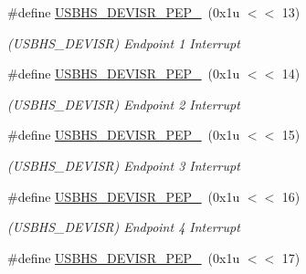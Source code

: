 \begin{DoxyCompactItemize}
\mbox{\label{group__SAME70__USBHS_ga345d60ae5fbb8b49e41a2683d10441bc}} 
\#define \mbox{\hyperlink{group__SAME70__USBHS_ga345d60ae5fbb8b49e41a2683d10441bc}{U\+S\+B\+H\+S\+\_\+\+D\+E\+V\+I\+S\+R\+\_\+\+P\+E\+P\+\_}}~(0x1u $<$$<$ 13)
\begin{DoxyCompactList}\small\item\em (U\+S\+B\+H\+S\+\_\+\+D\+E\+V\+I\+SR) Endpoint 1 Interrupt \end{DoxyCompactList}\item 
\mbox{\label{group__SAME70__USBHS_ga2a38367a8545f2bf724d27f571b76b51}} 
\#define \mbox{\hyperlink{group__SAME70__USBHS_ga2a38367a8545f2bf724d27f571b76b51}{U\+S\+B\+H\+S\+\_\+\+D\+E\+V\+I\+S\+R\+\_\+\+P\+E\+P\+\_}}~(0x1u $<$$<$ 14)
\begin{DoxyCompactList}\small\item\em (U\+S\+B\+H\+S\+\_\+\+D\+E\+V\+I\+SR) Endpoint 2 Interrupt \end{DoxyCompactList}\item 
\mbox{\label{group__SAME70__USBHS_gaee2002bc42efc064ad362756f2e5a662}} 
\#define \mbox{\hyperlink{group__SAME70__USBHS_gaee2002bc42efc064ad362756f2e5a662}{U\+S\+B\+H\+S\+\_\+\+D\+E\+V\+I\+S\+R\+\_\+\+P\+E\+P\+\_}}~(0x1u $<$$<$ 15)
\begin{DoxyCompactList}\small\item\em (U\+S\+B\+H\+S\+\_\+\+D\+E\+V\+I\+SR) Endpoint 3 Interrupt \end{DoxyCompactList}\item 
\mbox{\label{group__SAME70__USBHS_gadb9cfdfcb42105fde79a159efd6d3175}} 
\#define \mbox{\hyperlink{group__SAME70__USBHS_gadb9cfdfcb42105fde79a159efd6d3175}{U\+S\+B\+H\+S\+\_\+\+D\+E\+V\+I\+S\+R\+\_\+\+P\+E\+P\+\_}}~(0x1u $<$$<$ 16)
\begin{DoxyCompactList}\small\item\em (U\+S\+B\+H\+S\+\_\+\+D\+E\+V\+I\+SR) Endpoint 4 Interrupt \end{DoxyCompactList}\item 
\mbox{\label{group__SAME70__USBHS_ga834ec84fbf0e965e4c8e6e042d75c50e}} 
\#define \mbox{\hyperlink{group__SAME70__USBHS_ga834ec84fbf0e965e4c8e6e042d75c50e}{U\+S\+B\+H\+S\+\_\+\+D\+E\+V\+I\+S\+R\+\_\+\+P\+E\+P\+\_}}~(0x1u $<$$<$ 17)
$$
\end{DoxyCompactItemize}
